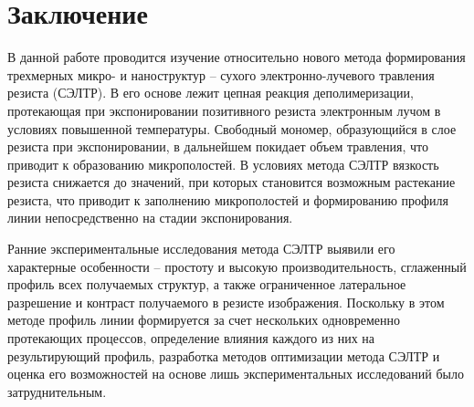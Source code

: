 \chapter*{Заключение}

В данной работе проводится изучение относительно нового метода формирования трехмерных микро- и наноструктур -- сухого электронно-лучевого травления резиста (СЭЛТР). В его основе лежит цепная реакция деполимеризации, протекающая при экспонировании позитивного резиста электронным лучом в условиях повышенной температуры. Свободный мономер, образующийся в слое резиста при экспонировании, в дальнейшем покидает объем травления, что приводит к образованию микрополостей. В условиях метода СЭЛТР вязкость резиста снижается до значений, при которых становится возможным растекание резиста, что приводит к заполнению микрополостей и формированию профиля линии непосредственно на стадии экспонирования.%

Ранние экспериментальные исследования метода СЭЛТР выявили его характерные особенности --  простоту и высокую производительность, сглаженный профиль всех получаемых структур, а также ограниченное латеральное разрешение и контраст получаемого в резисте изображения. Поскольку в этом методе профиль линии формируется за счет нескольких одновременно протекающих процессов, определение влияния каждого из них на результирующий профиль, разработка методов оптимизации метода СЭЛТР и оценка его возможностей на основе лишь экспериментальных исследований было затруднительным.

